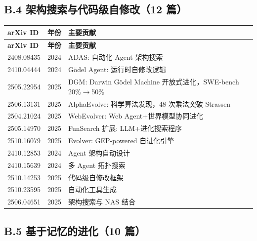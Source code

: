 \subsection*{B.4 架构搜索与代码级自修改（12 篇）}

\begin{longtable}{llp{7cm}}
\toprule
\textbf{arXiv ID} & \textbf{年份} & \textbf{主要贡献} \\
\midrule
\endfirsthead
\toprule
\textbf{arXiv ID} & \textbf{年份} & \textbf{主要贡献} \\
\midrule
\endhead
\bottomrule
\endlastfoot

2408.08435 & 2024 & ADAS: 自动化 Agent 架构搜索 \\
2410.04444 & 2024 & G\"{o}del Agent: 运行时自修改逻辑 \\
2505.22954 & 2025 & DGM: Darwin G\"{o}del Machine 开放式进化，SWE-bench 20\%$\to$50\% \\
2506.13131 & 2025 & AlphaEvolve: 科学算法发现，48 次乘法突破 Strassen \\
2504.21024 & 2025 & WebEvolver: Web Agent+世界模型协同进化 \\
2505.14970 & 2025 & FunSearch 扩展: LLM+进化搜索程序 \\
2510.16079 & 2025 & Evolver: GEP-powered 自进化引擎 \\
2410.12853 & 2024 & Agent 架构自动设计 \\
2410.15639 & 2024 & 多 Agent 拓扑搜索 \\
2510.14253 & 2025 & 代码级自修改框架 \\
2510.23595 & 2025 & 自动化工具生成 \\
2506.04651 & 2025 & 架构搜索与 NAS 结合 \\
\end{longtable}

\subsection*{B.5 基于记忆的进化（10 篇）}


